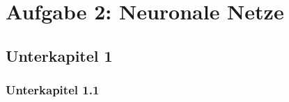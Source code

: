 \pagebreak
\section{Aufgabe 2: Neuronale Netze}
\subsection{Unterkapitel 1}
\subsubsection{Unterkapitel 1.1}